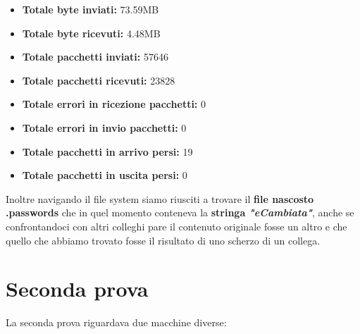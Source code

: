 \documentclass[a4paper]{report}
\begin{document}
\begin{enumerate}
	\begin{itemize}
		\item \textbf{Totale byte inviati:} 73.59MB
		\item \textbf{Totale byte ricevuti:} 4.48MB
		\item \textbf{Totale pacchetti inviati:} 57646
		\item \textbf{Totale pacchetti ricevuti: }23828
		\item \textbf{Totale errori in ricezione pacchetti:} 0
		\item \textbf{Totale errori in invio pacchetti:} 0
		\item \textbf{Totale pacchetti in arrivo persi:} 19
		\item \textbf{Totale pacchetti in uscita persi:} 0
	\end{itemize}
	
	Inoltre navigando il file system siamo riusciti a trovare il \textbf{file nascosto .passwords} che in quel momento conteneva la \textbf{stringa \textit{"eCambiata"}}, anche se confrontandoci con altri colleghi pare il contenuto originale fosse un altro e che quello che abbiamo trovato fosse il risultato di uno scherzo di un collega.	

\end{enumerate}

\section{Seconda prova}
La seconda prova riguardava due macchine diverse:
\end{document}
